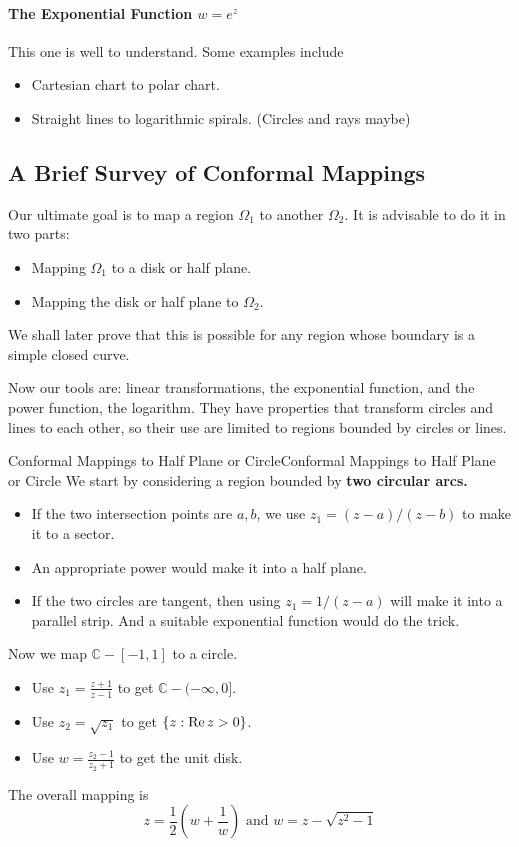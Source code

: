 \documentclass[../main.tex]{subfiles}
\begin{document}
\paragraph{The Exponential Function $w = e^z$}

This one is well to understand. Some examples include
\begin{itemize}
\item Cartesian chart to polar chart.
\item Straight lines to logarithmic spirals. (Circles and rays maybe)
\end{itemize}

\subsection{A Brief Survey of Conformal Mappings}

Our ultimate goal is to map a region $\Omega_1$ to another $\Omega_2$. It is advisable to do it in two parts:
\begin{itemize}
\item Mapping $\Omega_1$ to a disk or half plane.
\item Mapping the disk or half plane to $\Omega_2$.
\end{itemize}
We shall later prove that this is possible for any region whose boundary is a simple closed curve.

Now our tools are: linear transformations, the exponential function, and the power function, the logarithm. They have properties that transform circles and lines to each other, so their use are limited to regions bounded by circles or lines.

\begin{example}{Conformal Mappings to Half Plane or Circle}{Conformal Mappings to Half Plane or Circle}
We start by considering a region bounded by \textbf{two circular arcs.}
\begin{itemize}
\item If the two intersection points are $a,b$, we use $z_1 = (z-a) / (z-b)$ to make it to a sector.
\item An appropriate power would make it into a half plane.
\item If the two circles are tangent, then using $z_1 = 1 / (z-a)$ will make it into a parallel strip. And a suitable exponential function would do the trick.
\end{itemize}

Now we map $\mathbb{C}-[-1,1]$ to a circle.
\begin{itemize}
	\item Use $\displaystyle z_1 = \frac{z+1}{z-1}$ to get $\mathbb{C} - (-\infty ,0]$. 
	\item Use $z_2 = \sqrt{z_1}$ to get $\left\{ z: \operatorname{Re} z>0 \right\}$.
	\item Use $\displaystyle w = \frac{z_2-1}{z_2+1}$ to get the unit disk.
\end{itemize}
The overall mapping is
\begin{equation}\label{eq:segment-to-disk}
z = \frac{1}{2} \left(w + \frac{1}{w}\right) \text{ and } w = z - \sqrt{z^2-1}
\end{equation}
\end{example}
\end{document}
